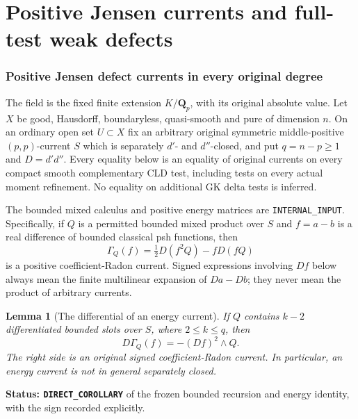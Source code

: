 \documentclass[11pt,a4paper]{article}
\numberwithin{equation}{section}
\newtheorem{lemma}[theorem]{Lemma}
\theoremstyle{definition}
\theoremstyle{remark}
\begin{document}


\part{Positive Jensen currents and full-test weak defects}

\section{Positive Jensen defect currents in every original degree}
\label{sec:r12-positive-jensen-defects}

The field is the fixed finite extension $K/\mathbf Q_p$, with its
original absolute value.  Let $X$ be good, Hausdorff, boundaryless,
quasi-smooth and pure of dimension $n$.  On an ordinary open set
$U\subset X$ fix an arbitrary original symmetric middle-positive
$(p,p)$-current $S$ which is separately $d'$- and $d''$-closed, and
put $q=n-p\geq1$ and $D=d'd''$.  Every equality below is an equality
of original currents on every compact smooth complementary CLD test,
including tests on every actual moment refinement.  No equality on
additional GK delta tests is inferred.

The bounded mixed calculus and positive energy matrices are
\texttt{INTERNAL\_INPUT}.  Specifically, if $Q$ is a permitted bounded
mixed product over $S$ and $f=a-b$ is a real difference of bounded
classical psh functions, then
\[
 \Gamma_Q(f)=\tfrac12D(f^2Q)-fD(fQ)
 \tag{JD1}
\]
is a positive coefficient-Radon current.  Signed expressions involving
$Df$ below always mean the finite multilinear expansion of $Da-Db$;
they never mean the product of arbitrary currents.

\begin{lemma}[The differential of an energy current]
\label{lem:r12-differential-energy-current}
If $Q$ contains $k-2$ differentiated bounded slots over $S$, where
$2\leq k\leq q$, then
\[
                 D\Gamma_Q(f)=-(Df)^2\wedge Q.
 \tag{JD2}
\]
The right side is an original signed coefficient-Radon current.
In particular, an energy current is not in general separately closed.
\end{lemma}

\noindent\textbf{Status: \texttt{DIRECT\_COROLLARY}} of the frozen
bounded recursion and energy identity, with the sign recorded explicitly.
\end{document}
